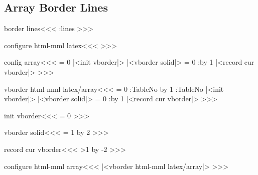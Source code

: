 {{{{{{%
\subsection{Array Border Lines}


\<border lines\><<<
\border:lines
>>>

\<configure html-mml latex\><<<
\def\border:lines{%
  \ifnum \borderlines>0 
     \ifnum \borderlines>1 border-right:solid 1px black;\fi
     \ifodd \borderlines border-left:solid 1px black;\fi
  \fi
}
>>>




\<config array\><<<
   {\HAssign\NewGroup = 0 
    |<init vborder|>}
   {|<vborder solid|>%
    \HAssign\NewGroup = 0}
   {\Advance:\NewGroup by 1 
    |<record cur vborder|>}
   {}
>>>



\<vborder html-mml latex/array\><<<
   {\let\VBorder=\empty \let\AllColMargins=\empty
    \global\let\GROUPS=\empty \HAssign\NewGroup = 0 
    \gHAdvance\Next:TableNo by 1 \global\let\TableNo=\Next:TableNo
    |<init vborder|>%
   }
   {|<vborder solid|>%
    \xdef\VBorder{\VBorder\ifnum \NewGroup> 0 </colgroup>\fi}
    \HAssign\NewGroup = 0  \gdef\GROUPS{rules="groups"}}
   {\Advance:\NewGroup by 1
    |<record cur vborder|>%
    \ifnum {} \xdef\VBorder{\VBorder<colgroup 
        id="TBL-\TableNo-\ar:cnt g">}\fi      
    \xdef\VBorder{\VBorder<col\Hnewline id="TBL-\TableNo
       -\ar:cnt"\xml:empty>}\xdef\AllColMargins{\AllColMargins1}}
   {\xdef\AllColMargins{\AllColMargins 0}}
>>>



\<init vborder\><<<
\HAssign\borderlines = 0
\global\let\columnlines=\relax
>>>

\<vborder solid\><<<
\ifx \columnlines\relax \gHAssign\borderlines = 1
                      \else \gHAdvance\borderlines by 2 \fi
>>>


\<record cur vborder\><<<
\ifnum \borderlines>1 \gHAdvance\borderlines by -2 \fi
\ifx \columnlines\relax 
    \global\let\columnlines\empty
\else
    \ifnum {} 
       \xdef\columnlines{\columnlines\ifx\columnlines\empty
                                     \else \space\fi solid}%
    \else
       \xdef\columnlines{\columnlines\ifx\columnlines\empty
                                     \else \space\fi none}%
    \fi
\fi
>>>

\<configure html-mml array\><<<
|<vborder html-mml latex/array|>
>>>

}}}}}}
